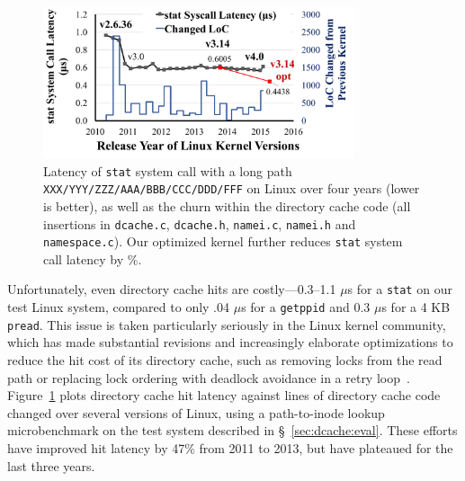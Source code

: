 \begin{figure}[t!]
\centering
\includegraphics[width=3.6in]{dcache/plots/latency-by-version.pdf}
\footnotesize
\caption[Lantecy of {\tt stat} system call over years.]
{Latency of {\tt stat} system call with a long path {\tt XXX/YYY/ZZZ/AAA/BBB/CCC/DDD/FFF} on Linux over four years (lower is better), as well as the churn within the directory cache code (all insertions in {\tt dcache.c}, {\tt dcache.h}, {\tt namei.c}, {\tt namei.h} and {\tt namespace.c}). 
Our optimized \linuxver{} kernel 
further reduces {\tt stat} system call latency by \statspeedup{}\%.}
\label{fig:dcache:by-version}
\end{figure}


Unfortunately, even directory cache hits are costly---0.3--1.1 $\mu$s for a {\tt stat} on our test Linux system, compared to only .04 $\mu$s for a {\tt getppid} and 0.3 $\mu$s for a 4 KB {\tt pread}. 
This issue is taken particularly seriously in the Linux kernel community, which has 
made substantial revisions and increasingly elaborate optimizations to reduce the hit cost
of its directory cache, such as removing locks from the read path or replacing lock ordering with deadlock avoidance in a retry loop~\citep{corbet09jls,dcache-rcu}.
Figure~\ref{fig:dcache:by-version} plots directory cache hit latency against  lines of directory cache code changed 
over several versions of Linux, using a path-to-inode lookup microbenchmark on the test system described
in \S~\ref{sec:dcache:eval}.
These efforts have improved hit latency by 47\% from 2011 to 2013, but have plateaued
for the last three years.

